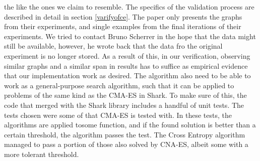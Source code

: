 the like the ones we claim to resemble. The specifics of the validation process
are described in detail in section \ref{varifyofce}. The paper only presents the
graphs from their experiments, and single examples from the final iterations
of their experiments. We tried to contact Bruno Scherrer in the hope that 
the data might still be available, however, he wrote back that the data fro the
original experiment is no longer stored. As a result of this, in our verification,
observing similar graphs and a similar span in results has to suffice as 
empirical evidence that our implementation work as desired. 
The algorithm also need to be able to work as a general-purpose 
search algorithm, such that it can be applied to problems of the same kind as 
the CMA-ES in Shark. To make sure of this, the code that merged with the 
Shark library includes a handful of unit tests. The tests chosen were some
of that CMA-ES is tested with. In these tests, the algorithms are applied tosome 
function, and if the found solution is better than a certain threshold, the 
algorithm passes the test. The Cross Entropy algorithm managed to pass a portion 
of those also solved by CNA-ES, albeit some with a more tolerant threshold.



